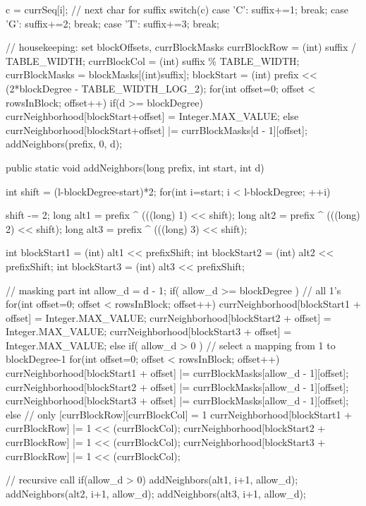 \documentclass[oneside,12pt]{DISCSthesis}
\begin{document}
{\begin{footnotesize}
\begin{verbatimtab}[2]
{{{			c = currSeq[i]; 					// next char for suffix
			switch(c) {
				case 'C': suffix+=1; break;
				case 'G': suffix+=2; break;
				case 'T': suffix+=3; break;
			}
			
			// housekeeping: set blockOffsets, currBlockMasks
			currBlockRow = (int) suffix / TABLE_WIDTH;
			currBlockCol = (int) suffix \% TABLE_WIDTH;
			currBlockMasks = blockMasks[(int)suffix];
			blockStart = (int) prefix << (2*blockDegree - TABLE_WIDTH_LOG_2);
			for(int offset=0; offset < rowsInBlock; offset++) {
				if(d >= blockDegree)
					currNeighborhood[blockStart+offset] = Integer.MAX_VALUE;
				else
					currNeighborhood[blockStart+offset] |= currBlockMasks[d - 1][offset];
			}
			addNeighbors(prefix, 0, d);
		}
	}

	public static void addNeighbors(long prefix, int start, int d) {
		int shift = (l-blockDegree-start)*2;
		for(int i=start; i < l-blockDegree; ++i) {
			shift -= 2;
			long alt1 = prefix ^ (((long) 1) << shift);
			long alt2 = prefix ^ (((long) 2) << shift);
			long alt3 = prefix ^ (((long) 3) << shift);

			int blockStart1 = (int) alt1 << prefixShift;
			int blockStart2 = (int) alt2 << prefixShift;
			int blockStart3 = (int) alt3 << prefixShift;

			// masking part
			int allow_d = d - 1;
			if( allow_d >= blockDegree ) {	// all 1's
				for(int offset=0; offset < rowsInBlock; offset++) {
					currNeighborhood[blockStart1 + offset] = Integer.MAX_VALUE;
					currNeighborhood[blockStart2 + offset] = Integer.MAX_VALUE;
					currNeighborhood[blockStart3 + offset] = Integer.MAX_VALUE;
				}
			}
			else if( allow_d > 0 ) {		// select a mapping from 1 to blockDegree-1
				for(int offset=0; offset < rowsInBlock; offset++) {
					currNeighborhood[blockStart1 + offset] 
							|= currBlockMasks[allow_d - 1][offset];
					currNeighborhood[blockStart2 + offset] 
							|= currBlockMasks[allow_d - 1][offset];
					currNeighborhood[blockStart3 + offset] 
							|= currBlockMasks[allow_d - 1][offset];
				}
			}
			else {							// only [currBlockRow][currBlockCol] = 1
				currNeighborhood[blockStart1 + currBlockRow] |= 1 << (currBlockCol);
				currNeighborhood[blockStart2 + currBlockRow] |= 1 << (currBlockCol);
				currNeighborhood[blockStart3 + currBlockRow] |= 1 << (currBlockCol);
			}

			// recursive call
			if(allow_d > 0) {
				addNeighbors(alt1, i+1, allow_d);
				addNeighbors(alt2, i+1, allow_d);
				addNeighbors(alt3, i+1, allow_d);
			}

}}}
\end{verbatimtab}
\end{footnotesize}}
\end{document}

